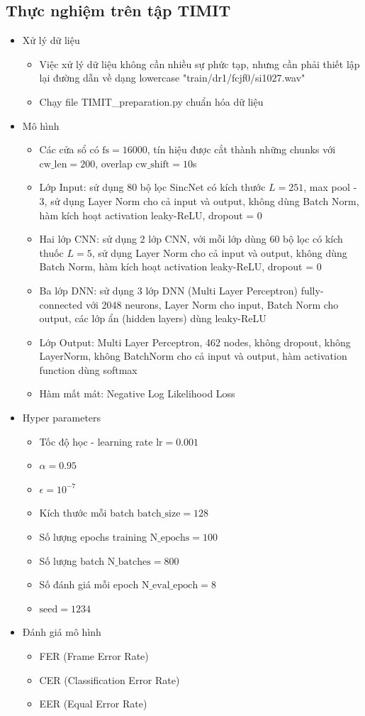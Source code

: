 \documentclass{article}
\begin{document}
	\subsection{Thực nghiệm trên tập TIMIT}
	\begin{itemize}
		\item Xử lý dữ liệu
		\begin{itemize}
			\item Việc xử lý dữ liệu không cần nhiều sự phức tạp, nhưng cần phải thiết lập lại đường dẫn về dạng lowercase "train/dr1/fcjf0/si1027.wav"
			\item Chạy file TIMIT\_preparation.py chuẩn hóa dữ liệu
		\end{itemize}
		\item Mô hình 
		\begin{itemize}
			\item Các cửa sổ có $\text{fs} = 16000$, tín hiệu được cắt thành những chunks với $\text{cw\_len}=200$, overlap $\text{cw\_shift}=10$s
			\item Lớp Input: sử dụng 80 bộ lọc SincNet có kích thước $L=251$, max pool - 3, sử dụng Layer Norm cho cả input và output, không dùng Batch Norm, hàm kích hoạt activation leaky-ReLU, dropout = 0
			\item Hai lớp CNN: sử dụng 2 lớp CNN, với mỗi lớp dùng 60 bộ lọc có kích thuốc $L=5$, sử dụng Layer Norm cho cả input và output, không dùng Batch Norm, hàm kích hoạt activation leaky-ReLU, dropout = 0
			\item Ba lớp DNN: sử dụng 3 lớp DNN (Multi Layer Perceptron) fully-connected với 2048 neurons, Layer Norm cho input, Batch Norm cho output, các lớp ẩn (hidden layers) dùng leaky-ReLU
			\item Lớp Output: Multi Layer Perceptron, 462 nodes, không dropout, không LayerNorm, không BatchNorm cho cả input và output, hàm activation function dùng softmax
			\item Hàm mất mát: Negative Log Likelihood Loss
		\end{itemize}
		\item Hyper parameters
		\begin{itemize}
			\item Tốc độ học - learning rate $\text{lr} = 0.001$
			\item $\alpha = 0.95$
			\item $\epsilon = 10^{-7}$
			\item Kích thước mỗi batch $\text{batch\_size}=128$
			\item Số lượng epochs training $\text{N\_epochs}=100$
			\item Số lượng batch $\text{N\_batches}=800$
			\item Số đánh giá mỗi epoch $\text{N\_eval\_epoch}=8$
			\item $\text{seed}=1234$
		\end{itemize}
		\item Đánh giá mô hình
		\begin{itemize}
			\item FER (Frame Error Rate)
			\item CER (Classification Error Rate)
			\item EER (Equal Error Rate)
		\end{itemize}
	\end{itemize}
\end{document}
